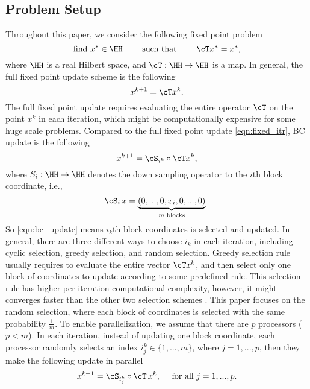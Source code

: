\subsection{Problem Setup}
Throughout this paper, we consider the following fixed point problem
\begin{equation}\label{eqn:fix_point_set}
\text{find } x^* \in \HH \qquad \text{ such that }  \qquad \cT x^* = x^*,
\end{equation}
where $\HH$ is a real Hilbert space, and $\cT: \HH \rightarrow \HH$ is a map. In general, the full fixed point update scheme is the following
\begin{equation}\label{eqn:fixed_itr}
x^{k+1} = \cT x^k.
\end{equation}
The full fixed point update requires evaluating the entire operator $\cT$ on the point $x^k$ in each iteration, which might be computationally expensive for some huge scale problems. Compared to the full fixed point update \eqref{eqn:fixed_itr}, BC update is the following
\begin{equation}\label{eqn:bc_update}
x^{k+1} = \cS_{i^k} \circ \cT x^k,
\end{equation}
where $S_i: \HH \rightarrow \HH$ denotes the down sampling operator to the $i$th block coordinate, i.e.,
\begin{equation}\label{eqn:ds_op}
\cS_i \, x = \underbrace{(0, ..., 0, x_i, 0, ..., 0)}_{m \text{~blocks}}.
\end{equation}
So \eqref{eqn:bc_update} means $i_k$th block coordinates is selected and updated. In general, there are three different ways to choose $i_k$ in each iteration, including cyclic selection, greedy selection, and random selection. Greedy selection rule usually requires to evaluate the entire vector $\cT x^k$, and then select only one block of coordinates to update according to some predefined rule. This selection rule has higher per iteration computational complexity, however, it might converges faster than the other two selection schemes \cite{??}.  This paper focuses on the random selection, where each block of coordinates is selected with the same probability $\frac{1}{m}$. To enable parallelization, we assume that there are $p$  processors ($p < m$). In each iteration, instead of updating one block coordinate, each processor randomly selects an index $i_j^k \in \{1, ..., m\}$, where $j = 1, ..., p$, then they make the following update in parallel
\begin{equation}\label{eqn:pa_bc_update}
x^{k+1} = \cS_{i_j^k} \circ \cT \, x^k, ~~~~\text{for all $j=1, ..., p.$}
\end{equation}


